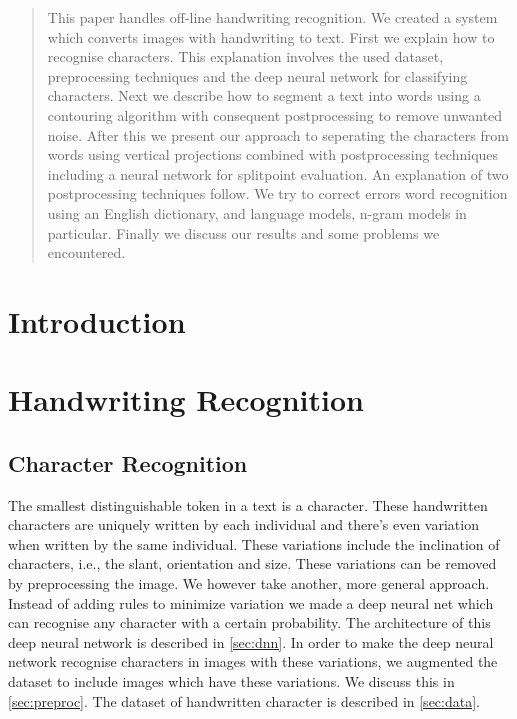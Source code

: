 \documentclass{article}
\begin{document}
 

\begin{abstract} 
This paper handles off-line handwriting recognition. We created a system which converts images with handwriting to text. First we explain how to recognise characters.
This explanation involves the used dataset, preprocessing techniques and the deep neural network for classifying characters. Next we describe how to segment a text into words using a contouring algorithm with consequent postprocessing to remove unwanted noise. After this we present our approach to seperating the characters from words using vertical projections combined with postprocessing techniques including a neural network for splitpoint evaluation. An explanation of two postprocessing techniques follow. We try to correct errors word recognition using an English dictionary, and language models, n-gram models in particular. Finally we discuss our results and some problems we encountered.

\end{abstract} 

\section{Introduction}
\section{Handwriting Recognition}

\subsection{Character Recognition}
The smallest distinguishable token in a text is a character. These handwritten characters are uniquely 
written by each individual and there's even variation when written by the same individual. These variations include the inclination of characters, i.e., the slant, orientation and size. These variations can be removed by preprocessing the image. We however take another, more general approach. Instead of adding rules to minimize variation we made a deep neural net which can recognise any character with a certain probability. The architecture of this deep neural network is described in \ref{sec:dnn}. In order to make the deep neural network recognise characters in images with these variations, we augmented the dataset to include images which have these variations. We discuss this in \ref{sec:preproc}. The dataset of handwritten character is described in \ref{sec:data}.
\end{document}
